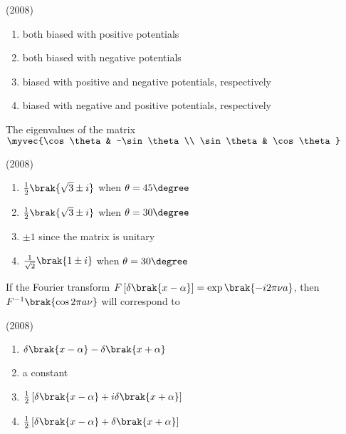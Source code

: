     \hfill{(2008)}

            \begin{enumerate}
                \item both biased with positive potentials
                \item both biased with negative potentials
                \item biased with positive and negative potentials, respectively
                \item biased with negative and positive potentials, respectively
            \end{enumerate}


    \item The eigenvalues of the matrix $\myvec{\cos\theta & -\sin\theta \\ \sin\theta & \cos\theta}$
    
    \hfill{(2008)}
		\begin{multicols}{2}
			\begin{enumerate}
				\item $\frac{1}{2}\brak{\sqrt{3}\pm i}$ when $\theta=45\degree$
				\item $\frac{1}{2}\brak{\sqrt{3}\pm i}$ when $\theta=30\degree$
				\item $\pm1$ since the matrix is unitary
				\item $\frac{1}{\sqrt{2}}\brak{1\pm i}$ when $\theta=30\degree$
			\end{enumerate}
		\end{multicols}

    \item If the Fourier transform $F\left[\delta\brak{x-\alpha}\right]=\exp\brak{-i2\pi\nu a}$, then $F^{-1}\brak{\cos 2\pi a\nu}$ will correspond to 
    
    \hfill{(2008)}

    \begin{multicols}{2}
       \begin{enumerate}
            \item $\delta\brak{x-\alpha}-\delta\brak{x+\alpha}$
            \item a constant
            \item $\frac{1}{2}\left[\delta\brak{x-\alpha}+i\delta\brak{x+\alpha}\right]$
            \item $\frac{1}{2}\left[\delta\brak{x-\alpha}+\delta\brak{x+\alpha}\right]$
        \end{enumerate}
    \end{multicols}
  
